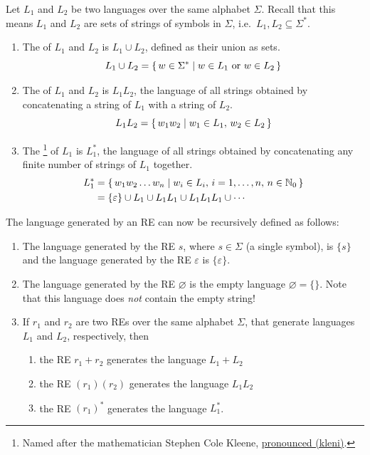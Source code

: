Let $L_1$ and $L_2$ be two languages over the same alphabet $\Sigma$. Recall that this means $L_1$ and $L_2$ are sets of strings of symbols in $\Sigma$, i.e.\ $L_1, L_2 \subseteq \Sigma^*$.
\begin{enumerate}
\item The  of $L_1$ and $L_2$ is $L_1 \cup L_2$, defined as their union as sets.
\begin{equation*}
L_1 \cup L_2 = \qty{\, w \in \Sigma^* \mid w \in L_1 ~\text{or}~ w \in L_2 \,}
\end{equation*}

\item The  of $L_1$ and $L_2$ is $L_1 L_2$, the language of all strings obtained by concatenating a string of $L_1$ with a string of $L_2$.
\begin{equation*}
L_1 L_2 = \qty{\, w_1 w_2 \mid w_1 \in L_1,\, w_2 \in L_2 \,}
\end{equation*}

\item The \footnote{Named after the mathematician Stephen Cole Kleene, \href{https://foldoc.org/Stephen+Kleene}{pronounced  (\textipa{\textprimstress}kle\textsci ni)}.} of $L_1$ is $L_1^*$, the language of all strings obtained by concatenating any finite number of strings of $L_1$ together.
\begin{align*}
L_1^* & = \qty{\, w_1 w_2 \dots w_n \mid w_i \in L_i,\, i = 1, \ldots, n,\, n \in \mathbb N_0 \,} \\
& = \{\varepsilon\} \cup L_1 \cup L_1 L_1 \cup L_1 L_1 L_1 \cup \cdots
\end{align*}
\end{enumerate}

The language generated by an RE can now be recursively defined as follows:
\begin{enumerate}
\item The language generated by the RE $s$, where $s \in \Sigma$ (a single symbol), is $\{s\}$ and the language generated by the RE $\varepsilon$ is $\{\varepsilon\}$.
\item The language generated by the RE $\varnothing$ is the empty language $\varnothing = \{\}$. Note that this language does \emph{not} contain the empty string!
\item If $r_1$ and $r_2$ are two REs over the same alphabet $\Sigma$, that generate languages $L_1$ and $L_2$, respectively, then
\begin{enumerate}[label = (\roman*)]
\item the RE $r_1 + r_2$ generates the language $L_1 + L_2$
\item the RE $(r_1)(r_2)$ generates the language $L_1 L_2$
\item the RE $(r_1)^*$ generates the language $L_1^*$.
\end{enumerate}
\end{enumerate}

